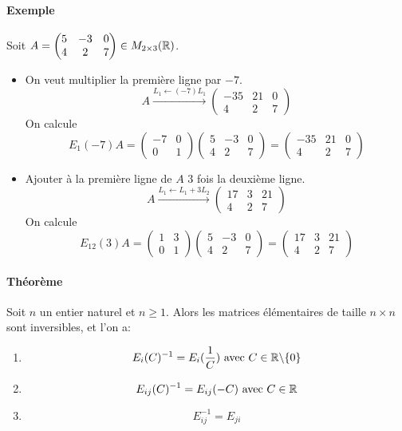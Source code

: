 \paragraph{Exemple} Soit $A = \begin{pmatrix} 5 & -3 & 0 \\ 4 & 2 & 7 \end{pmatrix} \in M_{2 \times 3}(\mathbb{R})$. 
\begin{itemize}
  \item On veut multiplier la première ligne par $-7$.
    $$A \xrightarrow {L_1 \leftarrow (-7)L_1} 
    \begin{pmatrix} -35 & 21 & 0 \\ 4 & 2 & 7 \end{pmatrix}$$
    On calcule
    $$E_1(-7) A 
      = \begin{pmatrix} -7 & 0 \\ 0 & 1 \end{pmatrix} \begin{pmatrix} 5 & -3 & 0 \\ 4 & 2 & 7 \end{pmatrix} 
      = \begin{pmatrix} -35 & 21 & 0 \\ 4 & 2 & 7 \end{pmatrix}$$

  \item Ajouter à la première ligne de $A$ $3$ fois la deuxième ligne.
    $$A \xrightarrow{L_1\leftarrow L_1+3L_2} 
      \begin{pmatrix} 17 & 3 & 21 \\ 4 & 2 & 7 \end{pmatrix}$$
    On calcule
    $$E_{1 2}(3) A 
      = \begin{pmatrix} 1 & 3 \\ 0 & 1 \end{pmatrix} \begin{pmatrix} 5 & -3 & 0 \\ 4 & 2 & 7 \end{pmatrix} 
      = \begin{pmatrix} 17 & 3 & 21 \\ 4 & 2 & 7 \end{pmatrix}$$
\end{itemize}

\paragraph{Théorème} Soit $n$ un entier naturel et $n \geq 1$. Alors les matrices élémentaires de taille $n \times n$ sont inversibles, et l'on a:
\begin{enumerate}
  \item $$E_i(C)^{-1} = E_i(\frac{1}{C}) \text{ avec } C \in \mathbb{R} \backslash \{ 0 \}$$
  \item $$E_{i j}(C)^{-1} = E_{i j}(-C) \text{ avec } C \in \mathbb{R}$$
  \item $$E_{i j}^{-1} = E_{j i}$$
\end{enumerate}

